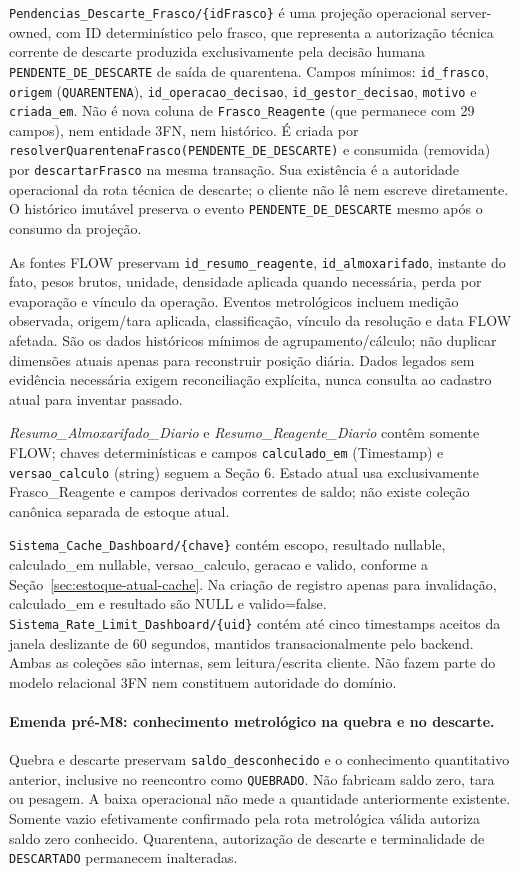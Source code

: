 \texttt{Pendencias\_Descarte\_Frasco/\{idFrasco\}} é uma projeção operacional server-owned, com ID determinístico pelo frasco, que representa a autorização técnica corrente de descarte produzida exclusivamente pela decisão humana \texttt{PENDENTE\_DE\_DESCARTE} de saída de quarentena. Campos mínimos: \texttt{id\_frasco}, \texttt{origem} (\texttt{QUARENTENA}), \texttt{id\_operacao\_decisao}, \texttt{id\_gestor\_decisao}, \texttt{motivo} e \texttt{criada\_em}. Não é nova coluna de \texttt{Frasco\_Reagente} (que permanece com 29 campos), nem entidade 3FN, nem histórico. É criada por \texttt{resolverQuarentenaFrasco(PENDENTE\_DE\_DESCARTE)} e consumida (removida) por \texttt{descartarFrasco} na mesma transação. Sua existência é a autoridade operacional da rota técnica de descarte; o cliente não lê nem escreve diretamente. O histórico imutável preserva o evento \texttt{PENDENTE\_DE\_DESCARTE} mesmo após o consumo da projeção.

As fontes FLOW preservam \texttt{id\_resumo\_reagente}, \texttt{id\_almoxarifado}, instante do fato, pesos brutos, unidade, densidade aplicada quando necessária, perda por evaporação e vínculo da operação. Eventos metrológicos incluem medição observada, origem/tara aplicada, classificação, vínculo da resolução e data FLOW afetada. São os dados históricos mínimos de agrupamento/cálculo; não duplicar dimensões atuais apenas para reconstruir posição diária. Dados legados sem evidência necessária exigem reconciliação explícita, nunca consulta ao cadastro atual para inventar passado.

\textit{Resumo\_Almoxarifado\_Diario} e \textit{Resumo\_Reagente\_Diario} contêm somente FLOW; chaves determinísticas e campos \texttt{calculado\_em} (Timestamp) e \texttt{versao\_calculo} (string) seguem a Seção 6. Estado atual usa exclusivamente Frasco\_Reagente e campos derivados correntes de saldo; não existe coleção canônica separada de estoque atual.

\texttt{Sistema\_Cache\_Dashboard/\{chave\}} contém escopo, resultado nullable, calculado\_em nullable, versao\_calculo, geracao e valido, conforme a Seção~\ref{sec:estoque-atual-cache}. Na criação de registro apenas para invalidação, calculado\_em e resultado são NULL e valido=false. \texttt{Sistema\_Rate\_Limit\_Dashboard/\{uid\}} contém até cinco timestamps aceitos da janela deslizante de 60 segundos, mantidos transacionalmente pelo backend. Ambas as coleções são internas, sem leitura/escrita cliente. Não fazem parte do modelo relacional 3FN nem constituem autoridade do domínio.

\paragraph{Emenda pré-M8: conhecimento metrológico na quebra e no descarte.}
Quebra e descarte preservam \texttt{saldo\_desconhecido} e o conhecimento quantitativo anterior, inclusive no reencontro como \texttt{QUEBRADO}. Não fabricam saldo zero, tara ou pesagem. A baixa operacional não mede a quantidade anteriormente existente. Somente vazio efetivamente confirmado pela rota metrológica válida autoriza saldo zero conhecido. Quarentena, autorização de descarte e terminalidade de \texttt{DESCARTADO} permanecem inalteradas.
